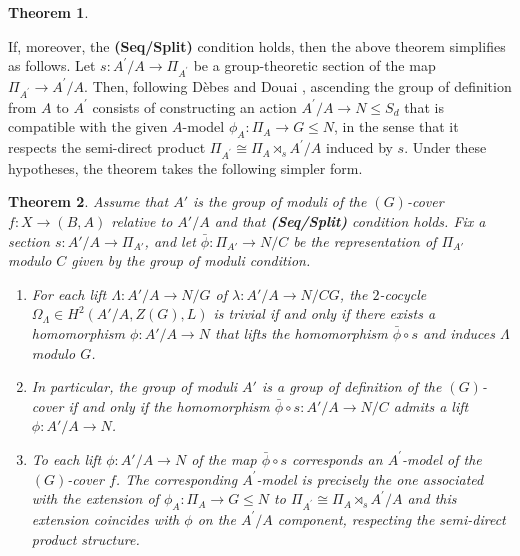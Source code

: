 \documentclass[10pt]{amsart}
\newtheorem{theorem}{Theorem}
\theoremstyle{definition}
\begin{document}
\begin{theorem}{\label{thm:DebesDouaiThB}}
\begin{enumerate}
\end{enumerate}
\end{theorem}


If, moreover, the \textbf{(Seq/Split)} condition holds, then the above theorem simplifies as follows. Let $s\colon A^\prime/A \rightarrow \Pi_{A^\prime}$ be a group-theoretic section of the map $\Pi_{A^\prime} \rightarrow A^\prime/A$. Then, following Dèbes and Douai \cite{DebesDouai97}, ascending the group of definition from $A$ to $A^\prime$ consists of constructing an action $A^\prime/A\rightarrow N\leq S_d$ that is compatible with the given $A$-model $\phi_A\colon \Pi_A\rightarrow G\leq N$, in the sense that it respects the semi-direct product $\Pi_{A^\prime} \cong \Pi_A \rtimes_s A^\prime/A$ induced by $s$. Under these hypotheses, the theorem takes the following simpler form.

\begin{theorem}{\label{thm:DebesDouaiTHC}}
  Assume that $A'$ is the group of moduli of the $(G)$-cover $f \colon X \rightarrow (B,A)$ relative to $A'/A$ and that \textbf{(Seq/Split)} condition holds. Fix a section $s\colon A'/A \rightarrow \Pi_{A'}$, and let $\bar{\phi} \colon \Pi_{A'} \rightarrow N/C$ be the representation of $\Pi_{A'}$ modulo $C$ given by the group of moduli condition.
  \begin{enumerate}
      \item For each lift $\Lambda \colon A'/A \rightarrow N/G$ of $\lambda \colon A'/A \rightarrow N/CG$, the $2$-cocycle $\Omega_\Lambda \in H^2(A'/A,Z(G),L)$ is trivial if and only if there exists a homomorphism $\phi\colon A'/A \rightarrow N$ that lifts the homomorphism $\bar{\phi} \circ s$ and induces $\Lambda$ modulo $G$. 
      
      \item In particular, the group of moduli $A'$ is a group of definition of the $(G)$-cover if and only if the homomorphism $\bar{\phi} \circ s \colon A'/A \rightarrow N/C$ admits a lift $\phi\colon A'/A \rightarrow N$. 
      
      \item To each lift $\phi \colon A'/A \rightarrow N$ of the map $\bar{\phi} \circ s$ corresponds an $A^\prime$-model of the $(G)$-cover $f$. The corresponding $A^\prime$-model is precisely the one associated with the extension of $\phi_A \colon \Pi_A\rightarrow G\leq N$ to $\Pi_{A^\prime} \cong \Pi_A \rtimes_s A^\prime/A$ and this extension coincides with $\phi$ on the $A^\prime/A$ component, respecting the semi-direct product structure.
        
     
  \end{enumerate}
  
\end{theorem}
\end{document}
